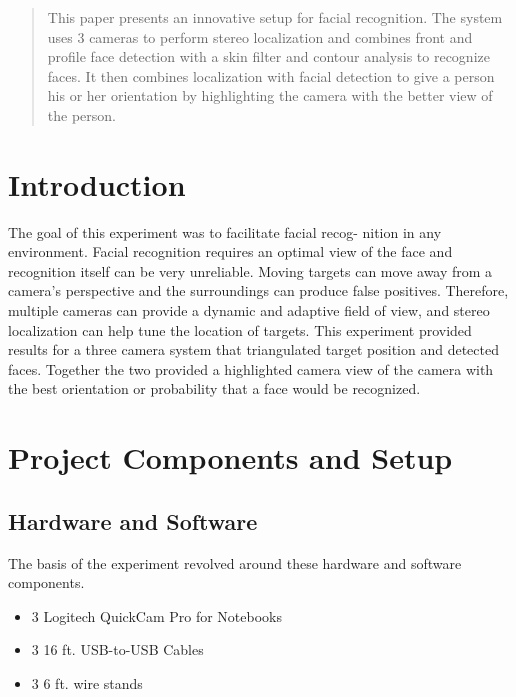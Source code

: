 \documentclass{acm_proc_article-sp}
\begin{document}
\maketitle
\begin{abstract}
This paper presents an innovative setup for facial recognition. The system uses 3 cameras to perform stereo localization and combines front and profile face detection with a skin filter and contour analysis to recognize faces. It then combines localization with facial detection to give a person his or her orientation by highlighting the camera with the better view of the person.
\end{abstract}



\section{Introduction}
The goal of this experiment was to facilitate facial recog- nition in any environment. Facial recognition requires an optimal view of the face and recognition itself can be very unreliable. Moving targets can move away from a camera's perspective and the surroundings can produce false positives. Therefore, multiple cameras can provide a dynamic and adaptive field of view, and stereo localization can help tune the location of targets. This experiment provided results for a three camera system that triangulated target position and detected faces. Together the two provided a 
highlighted camera view of the camera with the best orientation 
or probability that a face would be recognized.

\section{Project Components and Setup}

\subsection{Hardware and Software}
The basis of the experiment revolved around these hardware and software components.
\begin{itemize}
\item 3 Logitech QuickCam Pro for Notebooks
\item 3 16 ft. USB-to-USB Cables
\item 3 6 ft. wire stands
\end{itemize}
\end{document}
